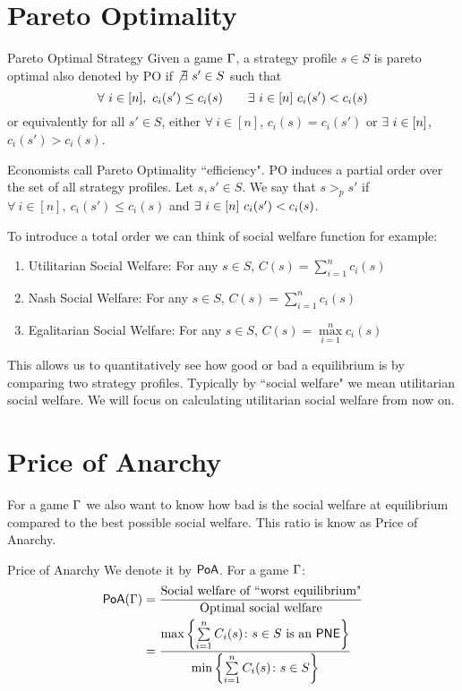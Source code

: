 \section{Pareto Optimality}
\begin{Definition}{Pareto Optimal Strategy}{}
Given a game $\Gamma$, a strategy profile $s\in S$	is pareto optimal also denoted by \textsf{PO} if $\not\exists\ s'\in S$ such that $$\forall\ i\in[n],\ c_i(s')\leq c_i(s)\qquad\exs\ i\in[n]\ c_i(s')<c_i(s)$$or equivalently for all $s'\in S$, either $\forall\ i\in[n]$, $c_i(s)=c_i(s')$ or $\exists\ i\in[n]$, $c_i(s')>c_i(s)$.
\end{Definition}

Economists call Pareto Optimality ``efficiency". \textsf{PO} induces a partial order over the set of all strategy profiles. Let $s,s'\in S$. We say that $s>_ps'$ if $\forall\ i\in[n],\ c_i(s')\leq c_i(s)$ and $\exs\ i\in[n]\ c_i(s')<c_i(s)$.

To introduce a total order we can think of  social welfare function for example:
\begin{enumerate}[label=(\arabic*)]
	\item Utilitarian Social Welfare: For any $s\in S$, $C(s)=\sum\limits_{i=1}^n c_i(s)$
	\item Nash Social Welfare: For any $s\in S$, $C(s)=\sum\limits_{i=1}^n c_i(s)$
	\item Egalitarian Social Welfare: For any $s\in S$, $C(s)=\max\limits_{i=1}^n c_i(s)$
\end{enumerate}This allows us to quantitatively see how good or bad a equilibrium is by comparing two strategy profiles. Typically by ``social welfare" we mean utilitarian social welfare. We will focus on calculating utilitarian social welfare from now on.
\section{Price of Anarchy}

For a game $\Gamma$ we also want to know how bad is the social welfare at equilibrium compared to the best possible social welfare. This ratio is know as Price of Anarchy.
\begin{Definition}{Price of Anarchy}{}
	We denote it by $\operatorname{\mathsf{PoA}}$. For a game $\Gamma$:\begin{align*}
		\operatorname{\mathsf{PoA}}(\Gamma)& =\frac{\text{Social welfare of ``worst equilibrium"}}{\text{Optimal social welfare}}\\
		&= \frac{\max\left\{\sum\limits_{i=1}^n C_i(s)\colon s\in S\text{ is an $\operatorname{\mathsf{PNE}}$}\right\}}{\min\left\{\sum\limits_{i=1}^n C_i(s)\colon s\in S\right\}}
	\end{align*}
\end{Definition}
